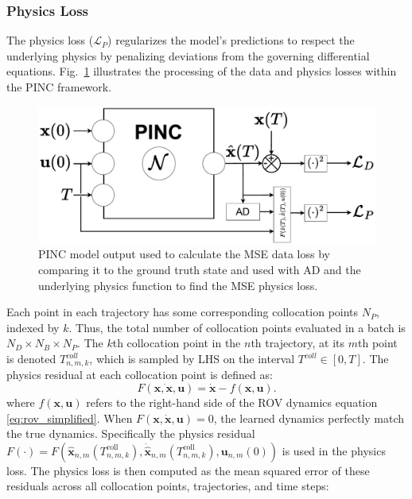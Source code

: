 \subsubsection{Physics Loss}
The physics loss ($\mathcal{L}_P$) regularizes the model’s predictions to respect the underlying physics by penalizing deviations from the governing differential equations. Fig.~\ref{fig:pinc_loss_processing} illustrates the processing of the data and physics losses within the PINC framework.
\begin{figure}[!b]
    \centering
    \includegraphics[width=0.70\linewidth]{figures/block_pinc_losses.pdf}
    \caption{PINC model output used to calculate the MSE data loss by comparing it to the ground truth state and used with AD and the underlying physics function to find the MSE physics loss.}
    \label{fig:pinc_loss_processing}
\end{figure}
Each point in each trajectory has some corresponding collocation points $N_P$, indexed by $k$. Thus, the total number of collocation points evaluated in a batch is $N_D\times N_B\times N_P$. The $k$th collocation point in the $n$th trajectory, at its $m$th point is denoted $T_{n,m,k}^{coll}$, which is sampled by LHS on the interval $T^{coll}\in[0,T]$. The physics residual at each collocation point is defined as:
\begin{equation}
    \label{eq:phy_residual}
    F(\mathbf{x}\dot{,\mathbf{x}},\mathbf{u}) = \dot{\mathbf{x}} - f(\mathbf{x},\mathbf{u}).
\end{equation}
where $f(\mathbf{x},\mathbf{u})$ refers to the right-hand side of the ROV dynamics equation \eqref{eq:rov_simplified}. When $F(\mathbf{x},\dot{\mathbf{x}},\mathbf{u}) =0$, the learned dynamics perfectly match the true dynamics. Specifically the physics residual $F\left(\cdot\right) = F\left(\hat{\mathbf{x}}_{n,m}(T_{n,m,k}^{\text{coll}}), \dot{\hat{\mathbf{x}}}_{n,m}(T_{n,m,k}^{\text{coll}}), \mathbf{u}_{n,m}(0)\right)$ is used in the physics loss. The physics loss is then computed as the mean squared error of these residuals across all collocation points, trajectories, and time steps: 

